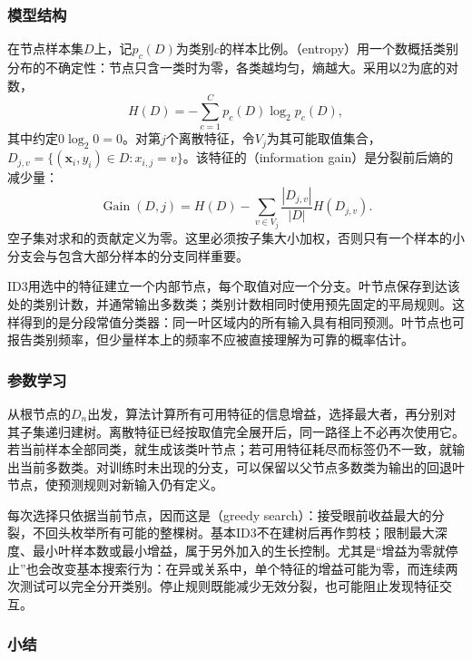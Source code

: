 \subsubsection{模型结构}
\label{sec:classification-id3-structure}

在节点样本集$D$上，记$p_c(D)$为类别$c$的样本比例。（entropy）用一个数概括类别分布的不确定性：节点只含一类时为零，各类越均匀，熵越大。采用以2为底的对数，
\begin{equation}
  H(D)=-\sum_{c=1}^{C}p_c(D)\log_2 p_c(D),
  \label{eq:classification-entropy}
\end{equation}
其中约定$0\log_2 0=0$。对第$j$个离散特征，令$V_j$为其可能取值集合，$D_{j,v}=\{(\bm{x}_i,y_i)\in D:x_{i,j}=v\}$。该特征的（information gain）是分裂前后熵的减少量：
\begin{equation}
  \operatorname{Gain}(D,j)
  =H(D)-\sum_{v\in V_j}\frac{|D_{j,v}|}{|D|}H(D_{j,v}).
  \label{eq:classification-information-gain}
\end{equation}
空子集对求和的贡献定义为零。这里必须按子集大小加权，否则只有一个样本的小分支会与包含大部分样本的分支同样重要。

ID3用选中的特征建立一个内部节点，每个取值对应一个分支。叶节点保存到达该处的类别计数，并通常输出多数类；类别计数相同时使用预先固定的平局规则。这样得到的是分段常值分类器：同一叶区域内的所有输入具有相同预测。叶节点也可报告类别频率，但少量样本上的频率不应被直接理解为可靠的概率估计。

\subsubsection{参数学习}
\label{sec:classification-id3-learning}

从根节点的$D_n$出发，算法计算所有可用特征的信息增益，选择最大者，再分别对其子集递归建树。离散特征已经按取值完全展开后，同一路径上不必再次使用它。若当前样本全部同类，就生成该类叶节点；若可用特征耗尽而标签仍不一致，就输出当前多数类。对训练时未出现的分支，可以保留以父节点多数类为输出的回退叶节点，使预测规则对新输入仍有定义。

每次选择只依据当前节点，因而这是（greedy search）：接受眼前收益最大的分裂，不回头枚举所有可能的整棵树。基本ID3不在建树后再作剪枝；限制最大深度、最小叶样本数或最小增益，属于另外加入的生长控制。尤其是“增益为零就停止”也会改变基本搜索行为：在异或关系中，单个特征的增益可能为零，而连续两次测试可以完全分开类别。停止规则既能减少无效分裂，也可能阻止发现特征交互。

\subsubsection{小结}
\label{sec:classification-id3-summary}

